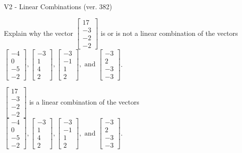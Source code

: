 \begin{exercise}
  \begin{exerciseTitle}V2 - Linear Combinations (ver. 382)\end{exerciseTitle}
  \begin{exerciseStatement}
    Explain why the vector \(\left[\begin{array}{c}
17 \\
-3 \\
-2 \\
-2
\end{array}\right]\)  is or is not a linear 
	combination of the vectors \(\left[\begin{array}{c}
-4 \\
0 \\
-5 \\
-2
\end{array}\right] , \left[\begin{array}{c}
-3 \\
1 \\
4 \\
2
\end{array}\right] , \left[\begin{array}{c}
-3 \\
-1 \\
1 \\
2
\end{array}\right] , \text{ and } \left[\begin{array}{c}
-3 \\
2 \\
-3 \\
-3
\end{array}\right]\).
	


  \end{exerciseStatement}
  \begin{exerciseAnswer}
   \(\left[\begin{array}{c}
17 \\
-3 \\
-2 \\
-2
\end{array}\right]\) 
  	 is  
	a linear combination of the vectors \(\left[\begin{array}{c}
-4 \\
0 \\
-5 \\
-2
\end{array}\right] , \left[\begin{array}{c}
-3 \\
1 \\
4 \\
2
\end{array}\right] , \left[\begin{array}{c}
-3 \\
-1 \\
1 \\
2
\end{array}\right] , \text{ and } \left[\begin{array}{c}
-3 \\
2 \\
-3 \\
-3
\end{array}\right]\).


\end{exerciseAnswer}
\end{exercise}
